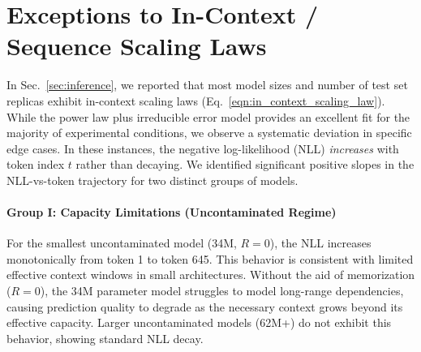 \section{Exceptions to In-Context / Sequence Scaling Laws}
\label{app:sec:exceptions_to_sequence_scaling_laws}


In Sec.~\ref{sec:inference}, we reported that most model sizes and number of test set replicas exhibit in-context scaling laws (Eq.~\ref{eqn:in_context_scaling_law}).
While the power law plus irreducible error model provides an excellent fit for the majority of experimental conditions, we observe a systematic deviation in specific edge cases.
In these instances, the negative log-likelihood (NLL) \textit{increases} with token index $t$ rather than decaying.
We identified significant positive slopes in the NLL-vs-token trajectory for two distinct groups of models.




\paragraph{Group I: Capacity Limitations (Uncontaminated Regime)}
For the smallest uncontaminated model (34M, $R=0$), the NLL increases monotonically from token 1 to token 645. This behavior is consistent with limited effective context windows in small architectures. Without the aid of memorization ($R=0$), the 34M parameter model struggles to model long-range dependencies, causing prediction quality to degrade as the necessary context grows beyond its effective capacity. Larger uncontaminated models (62M+) do not exhibit this behavior, showing standard NLL decay.

